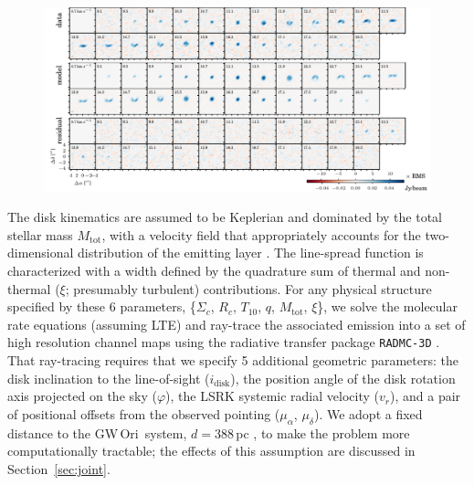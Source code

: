 \documentclass[twocolumn]{aastex61}
\newcommand{\obj}{GW\,Ori}
\begin{document}
\begin{figure}[ht!]
\begin{center}
  \includegraphics{chmaps_C18O.pdf}
  \end{center}
\end{figure}


The disk kinematics are assumed to be Keplerian and dominated by the total stellar mass $M_\mathrm{tot}$, with a velocity field that appropriately accounts for the two-dimensional distribution of the emitting layer \citep[see][]{rosenfeld13a}.  The  line-spread function is characterized with a width defined by the quadrature sum of thermal and non-thermal ($\xi$; presumably turbulent) contributions. For any physical structure specified by these 6 parameters, \{$\Sigma_c$, $R_c$, $T_{10}$, $q$, $M_\mathrm{tot}$, $\xi$\}, we solve the molecular rate equations (assuming LTE) and ray-trace the associated emission into a set of high resolution channel maps using the radiative transfer package {\tt RADMC-3D} \citep{dullemond12}. That ray-tracing requires that we specify 5 additional geometric parameters: the disk inclination to the line-of-sight ($i_\mathrm{disk}$), the position angle of the disk rotation axis projected on the sky ($\varphi$), the LSRK systemic radial velocity ($v_r$), and a pair of positional offsets from the observed pointing ($\mu_\alpha$, $\mu_\delta$). We adopt a fixed distance to the \obj\ system, $d = 388\,$pc \citep{kounkel17}, to make the problem more computationally tractable; the effects of this assumption are discussed in Section~\ref{sec:joint}.
\end{document}
